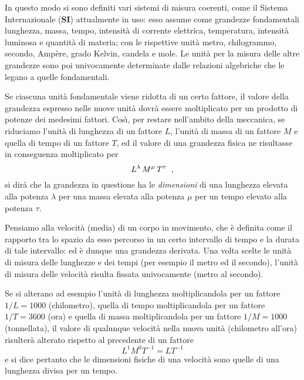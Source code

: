 In questo modo si sono definiti vari sistemi di misura
coerenti, come il Sistema Internazionale%
(\textbf{SI}) attualmente in uso: esso assume come grandezze
fondamentali lunghezza, massa, tempo, intensit\`a di
corrente elettrica, temperatura, intensit\`a luminosa e
quantit\`a di materia; con le rispettive unit\`a metro,
chilogrammo, secondo, Amp\`ere, grado Kelvin, candela e
mole.  Le unit\`a per la misura delle altre grandezze sono
poi univocamente determinate dalle relazioni algebriche che
le legano a quelle fondamentali.

%
Se ciascuna unit\`a fondamentale viene ridotta di un certo
fattore, il valore della grandezza espresso nelle nuove
unit\`a dovr\`a essere moltiplicato per un prodotto di
potenze dei medesimi fattori.  Cos\`\i, per restare
nell'ambito della meccanica, se riduciamo l'unit\`a di
lunghezza di un fattore $L$, l'unit\`a di massa di un
fattore $M$ e quella di tempo di un fattore $T$, ed il
valore di una grandezza fisica ne risultasse in conseguenza
moltiplicato per
\begin{equation*}
  L^\lambda \, M^\mu \, T^\tau \;\; ,
\end{equation*}
si dir\`a che la grandezza in questione ha le
\emph{dimensioni} di una lunghezza elevata alla potenza
$\lambda$ per una massa elevata alla potenza $\mu$ per un
tempo elevato alla potenza $\tau$.

Pensiamo alla velocit\`a (media) di un corpo in movimento,
che \`e definita come il rapporto tra lo spazio da esso
percorso in un certo intervallo di tempo e la durata di tale
intervallo: ed \`e dunque una grandezza derivata.  Una volta
scelte le unit\`a di misura delle lunghezze e dei tempi (per
esempio il metro ed il secondo), l'unit\`a di misura delle
velocit\`a risulta fissata univocamente (metro al secondo).

Se si alterano ad esempio l'unit\`a di lunghezza
moltiplicandola per un fattore $1 / L = 1000$ (chilometro),
quella di tempo moltiplicandola per un fattore $1 / T =
3600$ (ora) e quella di massa moltiplicandola per un fattore
$1 / M = 1000$ (tonnellata), il valore di qualunque
velocit\`a nella nuova unit\`a (chilometro all'ora)
risulter\`a alterato rispetto al precedente di un fattore
\begin{equation*}
  L^1 M^0 T^{-1} = L T^{-1}
\end{equation*}
e si dice pertanto che le dimensioni fisiche di una
velocit\`a sono quelle di una lunghezza divisa per un tempo.

